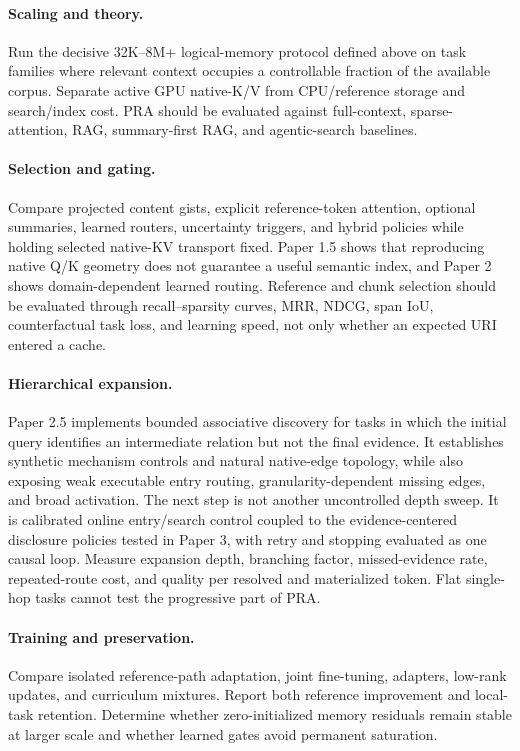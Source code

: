 \documentclass[11pt]{article}
\begin{document}
\paragraph{Scaling and theory.}
Run the decisive 32K--8M+ logical-memory protocol defined above on task families where relevant
context occupies a controllable fraction of the available corpus.  Separate active GPU native-K/V
from CPU/reference storage and search/index cost. PRA should be evaluated against full-context,
sparse-attention, RAG, summary-first RAG, and agentic-search baselines.

\paragraph{Selection and gating.}
Compare projected content gists, explicit reference-token attention, optional summaries,
learned routers, uncertainty triggers, and hybrid policies while holding selected native-KV
transport fixed. Paper 1.5 shows that reproducing native Q/K geometry does not guarantee a
useful semantic index, and Paper 2 shows domain-dependent learned routing. Reference and chunk
selection should be evaluated through recall--sparsity curves, MRR, NDCG, span IoU,
counterfactual task loss, and learning speed, not only whether an expected URI entered a cache.

\paragraph{Hierarchical expansion.}
Paper 2.5 implements bounded associative discovery for tasks in which the initial query identifies
an intermediate relation but not the final evidence.  It establishes synthetic mechanism
controls and natural native-edge topology, while also exposing weak executable entry routing,
granularity-dependent missing edges, and broad activation.  The next step is not another
uncontrolled depth sweep.  It is calibrated online entry/search control coupled to the
evidence-centered disclosure policies tested in Paper 3, with retry and stopping evaluated as one
causal loop.  Measure expansion depth, branching factor, missed-evidence rate, repeated-route cost,
and quality per resolved and materialized token.  Flat single-hop tasks cannot test the progressive
part of PRA.

\paragraph{Training and preservation.}
Compare isolated reference-path adaptation, joint fine-tuning, adapters, low-rank updates, and curriculum mixtures. Report both reference improvement and local-task retention. Determine whether zero-initialized memory residuals remain stable at larger scale and whether learned gates avoid permanent saturation.
\end{document}
